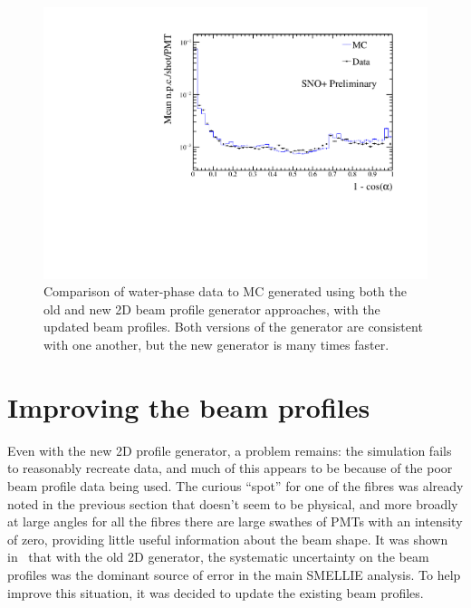 \begin{figure}
    \centering
    \includegraphics[width=\linewidth]{4_SMELLIESimulation/images/data_mc_comparison_npe_vs_r_114018_109_use_f.pdf}
    \caption[Comparison of water-phase data to MC generated using both the old and new 2D beam profile generator approaches, with the updated beam profiles]{Comparison of water-phase data to MC generated using both the old and new 2D beam profile generator approaches, with the updated beam profiles. Both versions of the generator are consistent with one another, but the new generator is many times faster.}
    \label{fig:data_generator_comp_new_profiles}
\end{figure}

\section{Improving the beam profiles}\label{sect:new_beam_profiles}
Even with the new 2D profile generator, a problem remains: the simulation fails to reasonably recreate data, and much of this appears to be because of the poor beam profile data being used. The curious ``spot'' for one of the fibres was already noted in the previous section that doesn't seem to be physical, and more broadly at large angles for all the fibres there are large swathes of PMTs with an intensity of zero, providing little useful information about the beam shape. It was shown in~\cite{turnerMeasurementScatteringCharacteristics2022} that with the old 2D generator, the systematic uncertainty on the beam profiles was the dominant source of error in the main SMELLIE analysis. To help improve this situation, it was decided to update the existing beam profiles.

